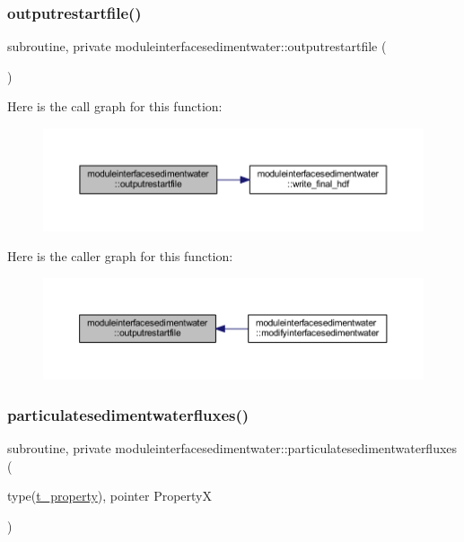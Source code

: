 \subsubsection{\texorpdfstring{outputrestartfile()}{outputrestartfile()}}
{\footnotesize\ttfamily subroutine, private moduleinterfacesedimentwater\+::outputrestartfile (\begin{DoxyParamCaption}{ }\end{DoxyParamCaption})\hspace{0.3cm}{\ttfamily [private]}}

Here is the call graph for this function\+:\nopagebreak
\begin{figure}[H]
\begin{center}
\leavevmode
\includegraphics[width=350pt]{namespacemoduleinterfacesedimentwater_a25afe0c9ade674061e39cc5e6456dd28_cgraph}
\end{center}
\end{figure}
Here is the caller graph for this function\+:\nopagebreak
\begin{figure}[H]
\begin{center}
\leavevmode
\includegraphics[width=350pt]{namespacemoduleinterfacesedimentwater_a25afe0c9ade674061e39cc5e6456dd28_icgraph}
\end{center}
\end{figure}
\mbox{\label{namespacemoduleinterfacesedimentwater_a1ea77fd3a708c35c8d23bb864a94a0ad}} 
\subsubsection{\texorpdfstring{particulatesedimentwaterfluxes()}{particulatesedimentwaterfluxes()}}
{\footnotesize\ttfamily subroutine, private moduleinterfacesedimentwater\+::particulatesedimentwaterfluxes (\begin{DoxyParamCaption}\item[{type(\mbox{\hyperlink{structmoduleinterfacesedimentwater_1_1t__property}{t\+\_\+property}}), pointer}]{PropertyX }\end{DoxyParamCaption})\hspace{0.3cm}{\ttfamily [private]}}

